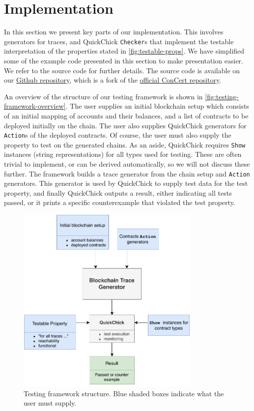\documentclass[twoside,11pt,openright]{report}
\newcommand{\coq}[1]{\texttt{#1}}
\begin{document}
\newpage
\section{Implementation}
In this section we present key parts of our implementation. This involves generators for traces, and QuickChick \coq{Checker}s that implement the testable interpretation of the properties stated in \autoref{fig:testable-props}. We have simplified some of the example code presented in this section to make presentation easier. We refer to the source code for further details. The source code is available on our \href{https://github.com/mikkelmilo/ConCert}{Github repository}, which is a fork of the \href{https://github.com/AU-COBRA/ConCert}{official ConCert repository}.

An overview of the structure of our testing framework is shown in \autoref{fig:testing-framework-overview}. The user supplies an initial blockchain setup which consists of an initial mapping of accounts and their balances, and a list of contracts to be deployed initially on the chain. The user also supplies QuickChick generators for \coq{Action}s of the deployed contracts. Of course, the user must also supply the property to test on the generated chains. As an aside, QuickChick requires \coq{Show} instances (string representations) for all types used for testing. These are often trivial to implement, or can be derived automatically, so we will not discuss these further. The framework builds a trace generator from the chain setup and \coq{Action} generators. This generator is used by QuickChick to supply test data for the test property, and finally QuickChick outputs a result, either indicating all tests passed, or it prints a specific counterexample that violated the test property.  
\begin{figure}[h]
\begin{center}
\includegraphics[width=0.8\textwidth]{media/testing-framework.pdf}
\end{center}
\caption[Testing framework structure.]{Testing framework structure. Blue shaded boxes indicate what the user must supply.}
\label{fig:testing-framework-overview}
\end{figure}
\end{document}
